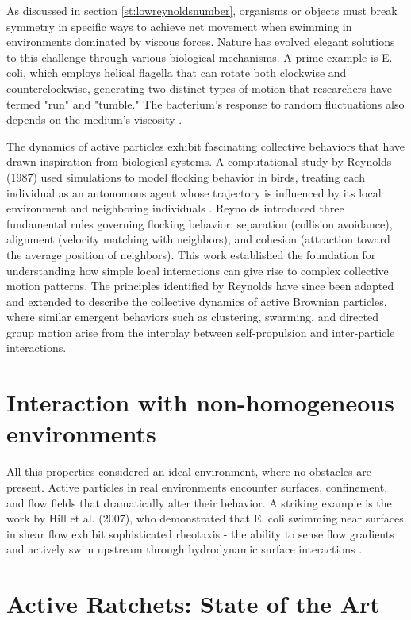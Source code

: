 As discussed in section \ref{st:lowreynoldsnumber}, organisms or objects must break symmetry in specific ways to achieve net movement when swimming in environments dominated by viscous forces. Nature has evolved elegant solutions to this challenge through various biological mechanisms. A prime example is E. coli, which employs helical flagella that can rotate both clockwise and counterclockwise, generating two distinct types of motion that researchers have termed "run" and "tumble." The bacterium's response to random fluctuations also depends on the medium's viscosity \cite{kumar2010physics}.

The dynamics of active particles exhibit fascinating collective behaviors that have drawn inspiration from biological systems. A computational study by Reynolds (1987) used simulations to model flocking behavior in birds, treating each individual as an autonomous agent whose trajectory is influenced by its local environment and neighboring individuals \cite{reynolds1987flocks}. Reynolds introduced three fundamental rules governing flocking behavior: separation (collision avoidance), alignment (velocity matching with neighbors), and cohesion (attraction toward the average position of neighbors). This work established the foundation for understanding how simple local interactions can give rise to complex collective motion patterns. The principles identified by Reynolds have since been adapted and extended to describe the collective dynamics of active Brownian particles, where similar emergent behaviors such as clustering, swarming, and directed group motion arise from the interplay between self-propulsion and inter-particle interactions.

\section{Interaction with non-homogeneous environments}

All this properties considered an ideal environment, where no obstacles are present. Active particles in real environments encounter surfaces, confinement, and flow fields that dramatically alter their behavior. A striking example is the work by Hill et al. (2007), who demonstrated that E. coli swimming near surfaces in shear flow exhibit sophisticated rheotaxis - the ability to sense flow gradients and actively swim upstream through hydrodynamic surface interactions \cite{hill2007hydrodynamic}. 

\section{Active Ratchets: State of the Art}


